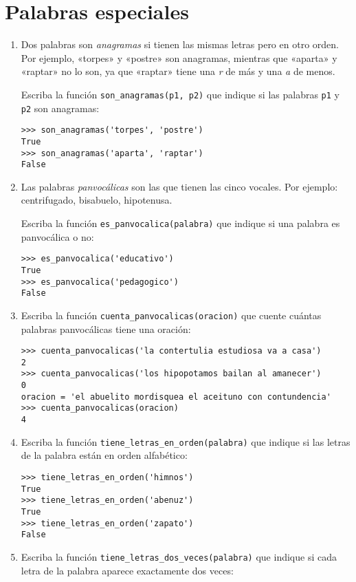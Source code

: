 \section{Palabras especiales}

\begin{enumerate}
\item
  Dos palabras son \emph{anagramas} si tienen las mismas letras pero
  en otro orden. Por ejemplo, «torpes» y «postre» son anagramas,
  mientras que «aparta» y «raptar» no lo son, ya que «raptar» tiene una
  \emph{r} de más y una \emph{a} de menos.

  Escriba la función \lstinline!son_anagramas(p1, p2)! que indique si
  las palabras \lstinline!p1! y \lstinline!p2! son anagramas:

\begin{lstlisting}
>>> son_anagramas('torpes', 'postre')
True
>>> son_anagramas('aparta', 'raptar')
False
\end{lstlisting}
\item
  Las palabras \emph{panvocálicas} son las que tienen las cinco
  vocales. Por ejemplo: centrifugado, bisabuelo, hipotenusa.

  Escriba la función \lstinline!es_panvocalica(palabra)! que indique si
  una palabra es panvocálica o no:

\begin{lstlisting}
>>> es_panvocalica('educativo')
True
>>> es_panvocalica('pedagogico')
False
\end{lstlisting}
\item
  Escriba la función \lstinline!cuenta_panvocalicas(oracion)! que cuente
  cuántas palabras panvocálicas tiene una oración:

\begin{lstlisting}
>>> cuenta_panvocalicas('la contertulia estudiosa va a casa')
2
>>> cuenta_panvocalicas('los hipopotamos bailan al amanecer')
0
oracion = 'el abuelito mordisquea el aceituno con contundencia'
>>> cuenta_panvocalicas(oracion)
4
\end{lstlisting}
\item
  Escriba la función \lstinline!tiene_letras_en_orden(palabra)! que
  indique si las letras de la palabra están en orden alfabético:

\begin{lstlisting}
>>> tiene_letras_en_orden('himnos')
True
>>> tiene_letras_en_orden('abenuz')
True
>>> tiene_letras_en_orden('zapato')
False
\end{lstlisting}
\item
  Escriba la función \lstinline!tiene_letras_dos_veces(palabra)! que
  indique si cada letra de la palabra aparece exactamente dos veces:


\end{enumerate}
